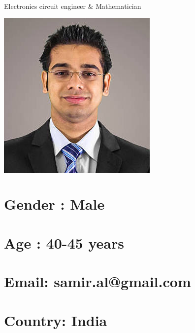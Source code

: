 \documentclass[]{friggeri-cv}
\begin{document}
      {Electronics circuit engineer \& Mathematician}
      

\begin{aside}
  \includegraphics[scale=0.25]{img/image2.jpg}
  \section{\large Gender : Male}
  \section{\large Age : 40-45 years}
  \section{\large Email: samir.al@gmail.com}
  \section{\large Country: India}
   ~ 

\end{aside}
\end{document}
